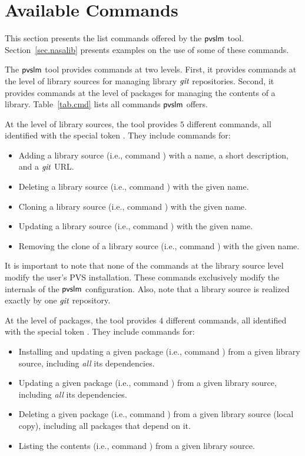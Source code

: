 \section{Available Commands}
\label{sec.cmd}

This section presents the list commands offered by the $\textsf{pvslm}$
tool. Section~\ref{sec.nasalib} presents examples on the use of some
of these commands.

The $\textsf{pvslm}$ tool provides commands at two levels. First, it provides
commands at the level of library sources for managing library $\textit{git}$
repositories.  Second, it provides commands at the level of packages
for managing the contents of a library. Table~\ref{tab.cmd} lists all
commands $\textsf{pvslm}$ offers.

At the level of library sources, the tool provides $5$ different
commands, all identified with the special token . They
include commands for:

\begin{itemize}
  \item Adding a library source (i.e., command ) with a
    name, a short description, and a $\textit{git}$ URL.
  \item Deleting a library source (i.e., command ) with
    the given name.
  \item Cloning a library source (i.e., command ) with the
    given name.
  \item Updating a library source (i.e., command ) with
    the given name.
  \item Removing the clone of a library source (i.e., command
    ) with the given name.
\end{itemize}

It is important to note that none of the commands at the library
source level modify the user's PVS installation. These commands
exclusively modify the internals of the $\textsf{pvslm}$ configuration. Also,
note that a library source is realized exactly by one $\textit{git}$
repository.

At the level of packages, the tool provides $4$ different
commands, all identified with the special token . They
include commands for:

\begin{itemize}
  \item Installing and updating a given package (i.e., command
    ) from a given library source, including {\em all} its
    dependencies.
  \item Updating a given package (i.e., command ) from a given
    library source, including {\em all} its dependencies.
  \item Deleting a given package (i.e., command ) from a given
    library source (local copy), including all packages that depend on
    it.
  \item Listing the contents (i.e., command ) from a given
    library source.
\end{itemize}

